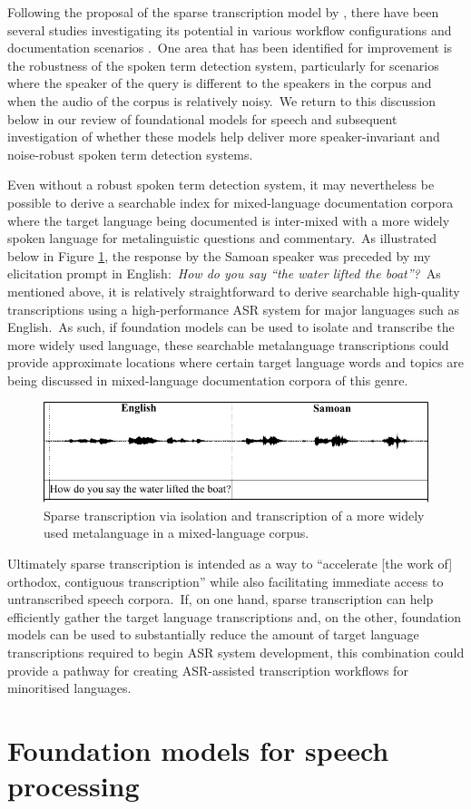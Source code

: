 \documentclass[main.tex]{subfiles}
\begin{document}
Following the proposal of the sparse transcription model by \textcite{bird-2020-sparse}, there have been several studies investigating its potential in various workflow configurations and documentation scenarios \parencite{leferrandEnablingInteractiveTranscription2020,le2021phone,le2022learning,lane2022finite,lane2021local}.~One area that has been identified for improvement is the robustness of the spoken term detection system, particularly for scenarios where the speaker of the query is different to the speakers in the corpus and when the audio of the corpus is relatively noisy.~We return to this discussion below in our review of foundational models for speech and subsequent investigation of whether these models help deliver more speaker-invariant and noise-robust spoken term detection systems.

Even without a robust spoken term detection system, it may nevertheless be possible to derive a searchable index for mixed-language documentation corpora where the target language being documented is inter-mixed with a more widely spoken language for metalinguistic questions and commentary.~As illustrated below in Figure \ref{fig:mixed}, the response by the Samoan speaker was preceded by my elicitation prompt in English:~\textit{How do you say ``the water lifted the boat''?}~As mentioned above, it is relatively straightforward to derive searchable high-quality transcriptions using a high-performance ASR system for major languages such as English.~As such, if foundation models can be used to isolate and transcribe the more widely used language, these searchable metalanguage transcriptions could provide approximate locations where certain target language words and topics are being discussed in mixed-language documentation corpora of this genre.

\begin{figure}[t]
  \centering
  \includegraphics[width=0.85\linewidth]{figures/intro-mixed-corpus.pdf}
  \caption{Sparse transcription via isolation and transcription of a more widely used metalanguage in a mixed-language corpus.}
  \label{fig:mixed}
\end{figure}

Ultimately sparse transcription is intended as a way to ``accelerate [the work of] orthodox, contiguous transcription'' \parencite[p.~737]{bird-2020-sparse} while also facilitating immediate access to untranscribed speech corpora.~If, on one hand, sparse transcription can help efficiently gather the target language transcriptions and, on the other, foundation models can be used to substantially reduce the amount of target language transcriptions required to begin ASR system development, this combination could provide a pathway for creating ASR-assisted transcription workflows for minoritised languages.

\section{Foundation models for speech processing}
\end{document}
